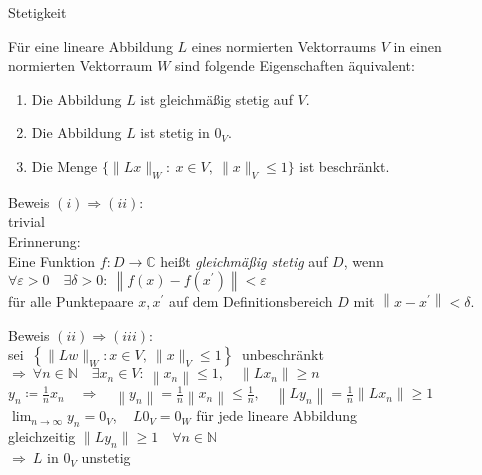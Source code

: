 \documentclass[AERbeamer%
,optBeamerClassicFormat%
,optLeftEquations   %
]{AERlatex}
\begin{document}
%
    \begin{frame}{Stetigkeit}
        \begin{Satz}
            Für eine lineare Abbildung $L$ eines normierten Vektorraums $V$ in einen normierten Vektorraum $W$ sind folgende Eigenschaften äquivalent:
            \begin{enumerate}
                [label=$(\roman*)$, leftmargin=2em]
                \item Die Abbildung $L$ ist gleichmäßig stetig auf $V$.
                \item Die Abbildung $L$ ist stetig in $0_V$.
                \item Die Menge $\{\|Lx\|_W: ~ x \in V, ~ \|x\|_V \leq 1\}$ ist beschränkt.
            \end{enumerate}
        \end{Satz}
    \end{frame}
%
    \begin{frame}{Beweis}
        \setlength{\baselineskip}{1.6\baselineskip}
%
        $(i) \Rightarrow (ii)$:\\ \pause
        trivial \\ \pause
        \vspace{1em}
        Erinnerung: \\
        Eine Funktion $f: D \rightarrow \mathbb{C}$ heißt \emph{gleichmäßig stetig} auf $D$, wenn \\
        $\forall \varepsilon>0 \quad \exists \delta>0: ~ \left\|f(x)-f\left(x^{\prime}\right)\right\|<\varepsilon$ \\
        für alle Punktepaare $x, x^{\prime}$ auf dem Definitionsbereich $D$ mit $\left\|x-x^{\prime}\right\|<\delta$.
    \end{frame}
%
    \begin{frame}{Beweis}
        \setlength{\baselineskip}{1.6\baselineskip}
%
        $(ii) \Rightarrow (iii)$: \\ \pause
        sei $ ~\left\{\|L w\|_W: x \in V, ~ \|x \|_V \leq 1\right\} ~$ unbeschränkt \\ \pause
        $\Rightarrow ~ \forall n \in \mathbb{N} \quad \exists x_n \in V: ~ \left\|x_n\right\| \leq 1, \quad \left\|L x_n\right\| \geq n$ \\ \pause
        $y_n \coloneqq \frac{1}{n} x_n \quad \Rightarrow \quad \left\|y_n\right\|=\frac{1}{n}\left\|x_n\right\| \leq \frac{1}{n}, \quad \left\|L y_n\right\|=\frac{1}{n}\left\|L x_n\right\| \geq 1$ \\ \pause
        $\lim _{n \rightarrow \infty} y_n=0_V$, ~ $L 0_V=0_W$ für jede lineare Abbildung \\ \pause
        gleichzeitig $\|Ly_n\| \geq 1 \quad \forall n \in \mathbb{N}$ \\ \pause
        $\Rightarrow ~ L$ in $0_V$ unstetig
    \end{frame}
\end{document}
